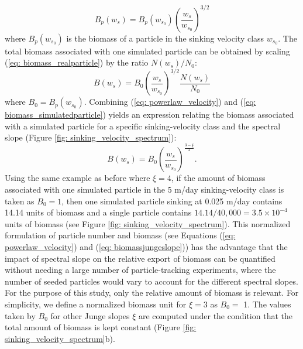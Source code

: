 \documentclass[article,linenumbers]{agujournal2018}
\begin{document}
\begin{equation}
	B_p(w_s) = B_p(w_{s_0})\left(\frac{w_s}{w_{s_0}}\right)^{3/2}
	\label{eq: biomass_realparticle}
\end{equation}
where $B_p(w_{s_0})$ is the biomass of a particle in the sinking velocity class $w_{s_0}$. The total biomass associated with one simulated particle can be obtained by scaling (\ref{eq: biomass_realparticle}) by the ratio $N(w_s)/N_0$:
\begin{equation}
	B(w_s) =  B_0\left(\frac{w_s}{w_{s_0}}\right)^{3/2}\frac{N(w_s)}{N_0}
	\label{eq: biomass_simulatedparticle}
\end{equation}
where $B_0 = B_p(w_{s_0})$. Combining (\ref{eq: powerlaw_velocity}) and (\ref{eq: biomass_simulatedparticle}) yields an expression relating the biomass associated with a simulated particle for a specific sinking-velocity class and the spectral slope (Figure \ref{fig: sinking_velocity_spectrum}):
\begin{equation}
	B(w_s) = B_0\left(\frac{w_s}{w_{s_0}}\right)^{\frac{3-\xi}{2}}.
	\label{eq: biomassjungeslope}
\end{equation}
Using the same example as before where $\xi = 4$, if the amount of biomass associated with one simulated particle in the 5 m/day sinking-velocity class is taken as $B_0 = 1$, then one simulated particle sinking at 0.025 m/day contains 14.14 units of biomass and a single particle contains $14.14/40,000 =3.5\times10^{-4}$ units of biomass (see Figure \ref{fig: sinking_velocity_spectrum}). This normalized formulation of particle number and biomass (see Equations (\ref{eq: powerlaw_velocity}) and (\ref{eq: biomassjungeslope})) has the advantage that the impact of spectral slope on the relative export of biomass can be quantified without needing a large number of particle-tracking experiments, where the number of seeded particles would vary to account for the different spectral slopes. For the purpose of this study, only the relative amount of biomass is relevant. For simplicity, we define a normalized biomass unit for $\xi =3$ as $B_0=$ 1. The values taken by $B_0$ for other Junge slopes $\xi$ are computed under the condition that the total amount of biomass is kept constant (Figure \ref{fig: sinking_velocity_spectrum}b).
\end{document}
